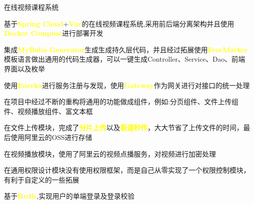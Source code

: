 
\begin{cventries}
	\cventry
	{} %
	{在线视频课程系统} %
	{} %
	{} %
	{
		\begin{cvitems} %
			\item {基于\textcolor{yellow}{\textbf{Spring Cloud}}+\textcolor{yellow}{\textbf{Vue}}的在线视频课程系统,采用前后端分离架构并且使用\textcolor{yellow}{\textbf{Docker Compose}}进行部署开发}
			\item {集成\textcolor{yellow}{\textbf{MyBatis Generator}}生成生成持久层代码，并且经过拓展使用\textcolor{yellow}{\textbf{FreeMarker}}模板语言做出通用的代码生成器，可以一键生成Controller、Service、Dao、前端界面以及枚举}
			\item {使用\textcolor{yellow}{\textbf{Eureka}}进行服务注册与发现，{使用\textcolor{yellow}{\textbf{Gateway}}作为网关进行对接口的统一处理}
				\item 在项目中经过不断的重构将通用的功能做成组件，例如:分页组件、文件上传组件、视频播放组件、富文本框}
			\item {在文件上传模块，完成了\textcolor{yellow}{\textbf{分片上传}}以及\textcolor{yellow}{\textbf{极速秒传}}，大大节省了上传文件的时间，最后使用阿里云的OSS进行存储}
			\item {在视频播放模块，使用了阿里云的视频点播服务，对视频进行加密处理}
			\item {在通用权限设计模块没有使用权限框架，而是自己从零实现了一个权限控制模块，有利于自定义的一些拓展}
			\item {基于\textcolor{yellow}{\textbf{Redis}},实现用户的单端登录及登录校验}
		\end{cvitems}
	}
	

\end{cventries}
